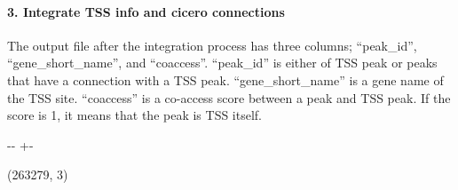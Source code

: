 \documentclass[letterpaper,10pt,english]{sphinxmanual}
\newlength\nbsphinxcodecellspacing
\begin{document}
\paragraph{3. Integrate TSS info and cicero connections}
\label{\detokenize{notebooks/01_ATAC-seq_data_processing/option1_scATAC-seq_data_analysis_with_cicero/02_preprocess_peak_data:3.-Integrate-TSS-info-and-cicero-connections}}
The output file after the integration process has three columns; “peak\_id”, “gene\_short\_name”, and “coaccess”. “peak\_id” is either of TSS peak or peaks that have a connection with a TSS peak. “gene\_short\_name” is a gene name of the TSS site. “coaccess” is a co-access score between a peak and TSS peak. If the score is 1, it means that the peak is TSS itself.

{
%
\begin{sphinxVerbatim}[commandchars=\\\{\}]
\llap{\color{nbsphinxin}[8]:\,\hspace{\fboxrule}\hspace{\fboxsep}}  
\end{sphinxVerbatim}
}



%
{
\kern-\sphinxverbatimsmallskipamount\kern-\baselineskip
\kern+\FrameHeightAdjust\kern-\fboxrule
\vspace{\nbsphinxcodecellspacing}
%
\begin{sphinxVerbatim}[commandchars=\\\{\}]
(263279, 3)
\end{sphinxVerbatim}
}
\relax
\end{document}
